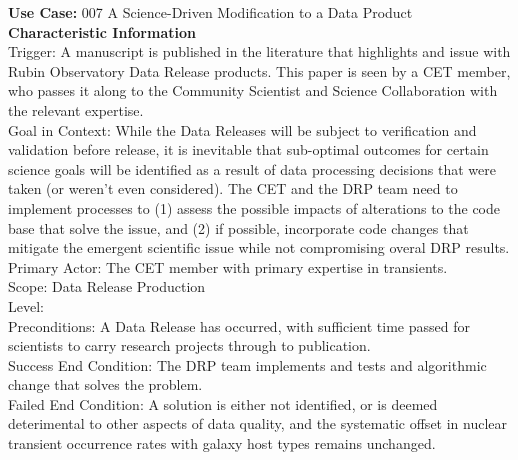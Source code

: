 {\bf Use Case:} 007 A Science-Driven Modification to a Data Product \\

{\bf Characteristic Information} \\
Trigger: A manuscript is published in the literature that highlights and issue with Rubin Observatory Data Release products. This paper is seen by a CET member, who passes it along to the Community Scientist and Science Collaboration with the relevant expertise. \\
Goal in Context: While the Data Releases will be subject to verification and validation before release, it is inevitable that sub-optimal outcomes for certain science goals will be identified as a result of data processing decisions that were taken (or weren't even considered).  The CET and the DRP team need to implement processes to (1) assess the possible impacts of alterations to the code base that solve the issue, and (2) if possible, incorporate code changes that mitigate the emergent scientific issue while not compromising overal DRP results. \\
Primary Actor: The CET member with primary expertise in transients. \\
Scope: Data Release Production \\
Level: \\
Preconditions: A Data Release has occurred, with sufficient time passed for scientists to carry research projects through to publication. \\
Success End Condition: The DRP team implements and tests and algorithmic change that solves the problem. \\
Failed End Condition: A solution is either not identified, or is deemed deterimental to other aspects of data quality, and the systematic offset in nuclear transient occurrence rates with galaxy host types remains unchanged. \\

